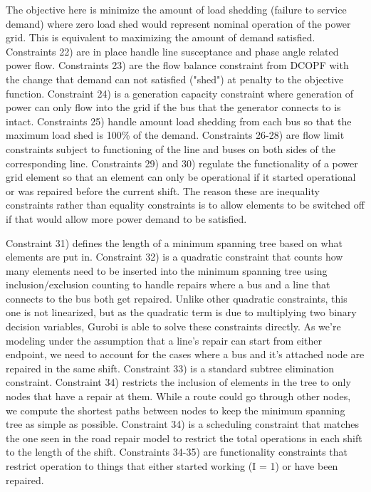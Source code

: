 \documentclass{article}
\begin{document}
	The objective here is minimize the amount of load shedding (failure to service demand) where zero load shed would represent nominal operation of the power grid. This is equivalent to maximizing the amount of demand satisfied.	Constraints 22) are in place handle line susceptance and phase angle related power flow. Constraints 23) are the flow balance constraint from DCOPF with the change that demand can not satisfied ("shed") at penalty to the objective function. Constraint 24) is a generation capacity constraint where generation of power can only flow into the grid if the bus that the generator connects to is intact. Constraints 25) handle amount load shedding from each bus so that the maximum load shed is 100\% of the demand. Constraints 26-28) are flow limit constraints subject to functioning of the line and buses on both sides of the corresponding line. Constraints 29) and 30) regulate the functionality of a power grid element so that an element can only be operational if it started operational or was repaired before the current shift. The reason these are inequality constraints rather than equality constraints is to allow elements to be switched off if that would allow more power demand to be satisfied.
	
	Constraint 31) defines the length of a minimum spanning tree based on what elements are put in. Constraint 32) is a quadratic constraint that counts how many elements need to be inserted into the minimum spanning tree using inclusion/exclusion counting to handle repairs where a bus and a line that connects to the bus both get repaired. Unlike other quadratic constraints, this one is not linearized, but as the quadratic term is due to multiplying two binary decision variables, Gurobi is able to solve these constraints directly. As we're modeling under the assumption that a line's repair can start from either endpoint, we need to account for the cases where a bus and it's attached node are repaired in the same shift. Constraint 33) is a standard subtree elimination constraint. Constraint 34) restricts the inclusion of elements in the tree to only nodes that have a repair at them. While a route could go through other nodes, we compute the shortest paths between nodes to keep the minimum spanning tree as simple as possible. Constraint 34) is a scheduling constraint that matches the one seen in the road repair model to restrict the total operations in each shift to the length of the shift. Constraints 34-35) are functionality constraints that restrict operation to things that either started working (I = 1) or have been repaired.
	
\end{document}
